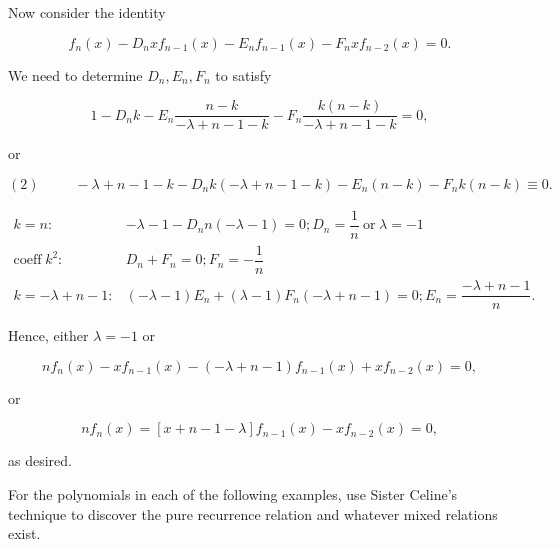 \begin{solution}
Now consider the identity

$$f_n(x) - D_n x f_{n-1}(x) - E_n f_{n-1}(x) - F_nxf_{n-2}(x) =0.$$

We need to determine $D_n, E_n, F_n$ to satisfy

$$1 - D_nk - E_n \dfrac{n-k}{-\lambda +n-1-k} - F_n \dfrac{k(n-k)}{-\lambda+n-1-k} =0,$$

or

$$(2) \hspace{30pt} -\lambda+n-1-k - D_n k(-\lambda+n-1-k) -E_n(n-k)-F_nk(n-k)\equiv 0.$$

$$\begin{array}{ll}
k=n: & -\lambda-1 - D_n n(-\lambda-1) = 0; D_n = \dfrac{1}{n} \mathrm{\hspace{3pt} or \hspace{3pt}} \lambda=-1 \\
\mathrm{coeff \hspace{3pt}} k^2: & D_n+F_n=0; F_n = -\dfrac{1}{n} \\
k=-\lambda+n-1: & (-\lambda-1)E_n + (\lambda-1)F_n(-\lambda+n-1)=0; E_n = \dfrac{-\lambda+n-1}{n}.
\end{array}$$

Hence, either $\lambda=-1$ or

$$nf_n(x) - xf_{n-1}(x) -(-\lambda+n-1)f_{n-1}(x) + xf_{n-2}(x) = 0,$$

or

$$nf_n(x) = [x+n-1-\lambda]f_{n-1}(x) - xf_{n-2}(x) =0,$$

as desired.
\end{solution}
For the polynomials in each of the following examples, use Sister Celine's technique to discover the pure recurrence relation and whatever mixed relations exist.

